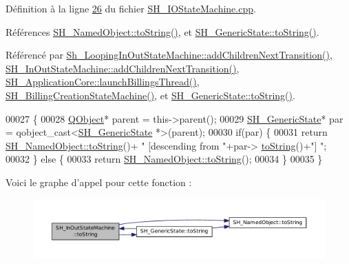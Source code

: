 Définition à la ligne \hyperlink{SH__IOStateMachine_8cpp_source_l00026}{26} du fichier \hyperlink{SH__IOStateMachine_8cpp_source}{S\-H\-\_\-\-I\-O\-State\-Machine.\-cpp}.



Références \hyperlink{classSH__NamedObject_af73e97f6476ca1ef3a22b159d179f5e7}{S\-H\-\_\-\-Named\-Object\-::to\-String()}, et \hyperlink{classSH__GenericState_a5480c5ee725fd801d8f6292cd4c803b8}{S\-H\-\_\-\-Generic\-State\-::to\-String()}.



Référencé par \hyperlink{classSh__LoopingInOutStateMachine_acfd8d0711c793b13c759f6c50be6a315}{Sh\-\_\-\-Looping\-In\-Out\-State\-Machine\-::add\-Children\-Next\-Transition()}, \hyperlink{classSH__InOutStateMachine_a689e5513ef6ef3fc1598efacd413372e}{S\-H\-\_\-\-In\-Out\-State\-Machine\-::add\-Children\-Next\-Transition()}, \hyperlink{classSH__ApplicationCore_a30738281acefd721fe9d06db46dcf123}{S\-H\-\_\-\-Application\-Core\-::launch\-Billings\-Thread()}, \hyperlink{classSH__BillingCreationStateMachine_ad62b77fa4aeafe200056ff3974562f83}{S\-H\-\_\-\-Billing\-Creation\-State\-Machine()}, et \hyperlink{classSH__GenericState_a5480c5ee725fd801d8f6292cd4c803b8}{S\-H\-\_\-\-Generic\-State\-::to\-String()}.


\begin{DoxyCode}
00027 \{
00028     \hyperlink{classQObject}{QObject}* parent = this->parent();
00029     \hyperlink{classSH__GenericState}{SH\_GenericState}* par = qobject\_cast<\hyperlink{classSH__GenericState}{SH\_GenericState} *>(parent);
00030     \textcolor{keywordflow}{if}(par) \{
00031         \textcolor{keywordflow}{return} \hyperlink{classSH__NamedObject_af73e97f6476ca1ef3a22b159d179f5e7}{SH\_NamedObject::toString}()+ \textcolor{stringliteral}{" [descending from "}+par->
      \hyperlink{classSH__GenericState_a5480c5ee725fd801d8f6292cd4c803b8}{toString}()+\textcolor{stringliteral}{"] "};
00032     \} \textcolor{keywordflow}{else} \{
00033         \textcolor{keywordflow}{return} \hyperlink{classSH__NamedObject_af73e97f6476ca1ef3a22b159d179f5e7}{SH\_NamedObject::toString}();
00034     \}
00035 \}
\end{DoxyCode}


Voici le graphe d'appel pour cette fonction \-:
\nopagebreak
\begin{figure}[H]
\begin{center}
\leavevmode
\includegraphics[width=350pt]{classSH__InOutStateMachine_a60ecd7de03d948e2d1e9cbedb5c3e5fa_cgraph}
\end{center}
\end{figure}




